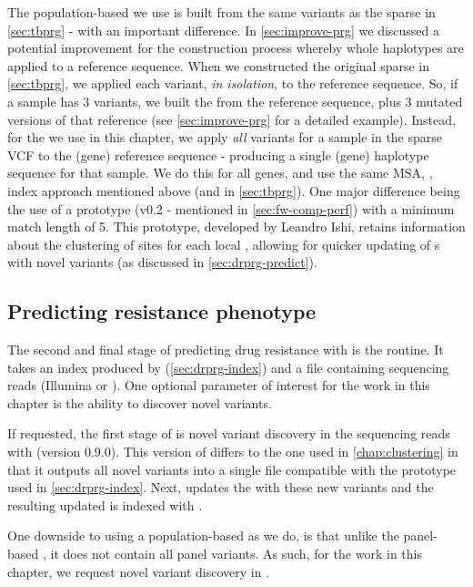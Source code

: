 The population-based \panrg{} we use is built from the same variants as the sparse \panrg{} in \autoref{sec:tbprg} - with an important difference. In \autoref{sec:improve-prg} we discussed a potential improvement for the \panrg{} construction process whereby whole haplotypes are applied to a reference sequence. When we constructed the original sparse \panrg{} in \autoref{sec:tbprg}, we applied each variant, \emph{in isolation}, to the reference sequence. So, if a sample has 3 variants, we built the \prg{} from the reference sequence, plus 3 mutated versions of that reference (see \autoref{sec:improve-prg} for a detailed example). Instead, for the \panrg{} we use in this chapter, we apply \emph{all} variants for a sample in the sparse VCF to the (gene) reference sequence - producing a single (gene) haplotype sequence for that sample. We do this for all genes, and use the same MSA, \makeprg{}, \pandora{} index approach mentioned above (and in \autoref{sec:tbprg}). One major difference being the use of a \makeprg{} prototype (v0.2 - mentioned in \autoref{sec:fw-comp-perf}) with a minimum match length of 5. This prototype, developed by Leandro Ishi, retains information about the clustering of sites for each local \prg{}, allowing for quicker updating of \prg{}s with novel variants (as discussed in \autoref{sec:drprg-predict}).


\subsection{Predicting resistance phenotype}
\label{sec:drprg-predict}

The second and final stage of predicting drug resistance with \drprg{} is the  routine. It takes an index produced by \drprg{}  (\autoref{sec:drprg-index}) and a file containing sequencing reads (Illumina or \ont{}). One optional parameter of interest for the work in this chapter is the ability to discover novel variants.

If requested, the first stage of \drprg{}  is novel variant discovery in the sequencing reads with \pandora{}  (version 0.9.0). This version of \pandora{} differs to the one used in \autoref{chap:clustering} in that it outputs all novel variants into a single file compatible with the \makeprg{} prototype used in \autoref{sec:drprg-index}. Next, \makeprg{} updates the \drprg{} \panrg{} with these new variants and the resulting updated \panrg{} is indexed with \pandora{}. 

One downside to using a population-based \panrg{} as we do, is that unlike the panel-based \panrg{}, it does not contain all panel variants. As such, for the work in this chapter, we request novel variant discovery in \drprg{} .

